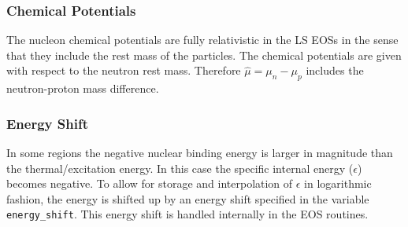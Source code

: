 \documentclass[10pt,nofootinbib]{article}
\newcommand{\code}[1]{\texttt{#1}}
\begin{document}
\subsubsection{Chemical Potentials}
The nucleon chemical potentials are fully relativistic in the LS EOSs
 in the sense that they include the rest mass of the particles.  The
 chemical potentials are given with respect to the neutron rest mass.
 Therefore $\hat{\mu} = \mu_n-\mu_p$ includes the neutron-proton mass
 difference.

\subsubsection{Energy Shift}
In some regions the negative nuclear binding energy is larger in
magnitude than the thermal/excitation energy. In this case the
specific internal energy ($\epsilon$) becomes negative. To allow for storage
and interpolation of $\epsilon$ in logarithmic fashion, the energy is shifted
up by an energy shift specified in the variable \code{energy\_shift}. This
energy shift is handled internally in the EOS routines.
\end{document}
